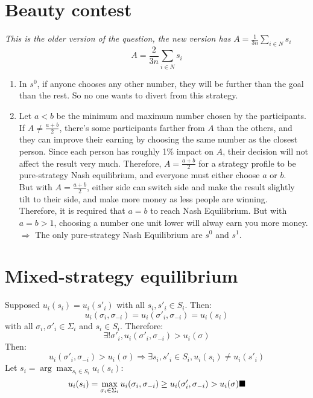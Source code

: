 \documentclass{article}
\begin{document}
\section{Beauty contest}
\textit{This is the older version of the question, the new version has} $A = \frac{1}{3n}\sum_{i \in N}s_i$
\[
  A = \frac{2}{3n}\sum_{i \in N}s_i
\]
\begin{enumerate}
  \item In $s^0$, if anyone chooses any other number, they will be further than the goal than the rest. So no one wants to divert from this strategy.
  \item Let $a<b$ be the minimum and maximum number chosen by the participants. If $A \neq \frac{a+b}{2}$, there's some participants farther from $A$ than the others, and they can improve their earning by choosing the same number as the closest person. Since each person has roughly 1\% impact on $A$, their decision will not affect the result very much. Therefore, $A = \frac{a+b}{2}$ for a strategy profile to be pure-strategy Nash equilibrium, and everyone must either choose $a$ or $b$. \\
  But with $A = \frac{a+b}{2}$, either side can switch side and make the result slightly tilt to their side, and make more money as less people are winning. \\
  Therefore, it is required that $a=b$ to reach Nash Equilibrium. But with $a = b > 1$, choosing a number one unit lower will alway earn you more money. \\
  $\Rightarrow$ The only pure-strategy Nash Equilibrium are $s^0$ and $s^1$.

\end{enumerate}

\section{Mixed-strategy equilibrium}
  Supposed $u_i(s_i) = u_i(s'_i)$ with all $s_i, s'_i \in S_i$. Then:
\[
  u_i(\sigma_i, \sigma_{-i}) = u_i(\sigma'_i, \sigma_{-i}) = u_i(s_i)
\]
  with all $\sigma_i, \sigma'_i \in \Sigma_i$ and $s_i \in S_i$. Therefore:
  \[
    \exists ! \sigma'_i, u_i(\sigma'_i, \sigma_{-i}) > u_i(\sigma)
  \]
  Then:
  \[
    u_i(\sigma'_i, \sigma_{-i}) > u_i(\sigma) \Rightarrow \exists s_i, s'_i \in S_i, u_i(s_i) \neq u_i(s'_i)
  \]
  Let $s_i = \arg \max_{s_i \in S_i} u_i(s_i)$:
  \[
    u_i(s_i) = \max_{\sigma_i \in \Sigma_i} u_i(\sigma_i, \sigma_{-i}) \ge u_i(\sigma'_i, \sigma_{-i}) > u_i(\sigma) \hfill\blacksquare
  \]
\end{document}
